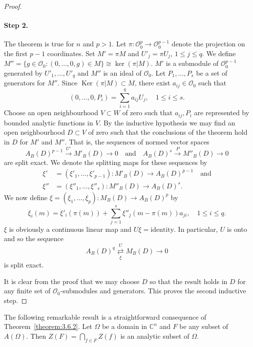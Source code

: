 \begin{proof}
\paragraph*{Step 2.} The theorem is true for $n$ and $p>1$. Let $\pi:\mathcal O_0^p\to\mathcal O_0^{p-1}$ denote the projection on the first $p-1$ coordinates. Set $M'=\pi M$ and $U'_j=\pi U_j$, $1\leq j\leq q$. We define $M''=\{g\in\mathcal O_0:(0,\ldots,0,g)\in M\}\cong\ker(\pi|M)$. $M'$ is a submodule of $\mathcal O_0^{p-1}$ generated by $U'_1,\ldots,U'_q$ and $M''$ is an ideal of $\mathcal O_0$. Let $P_1,\ldots,P_s$ be a set of generators for $M''$. Since $\operatorname{Ker}(\pi|M)\subset M$, there exist $a_{ij}\in\mathcal O_0$ such that
\[(0,\ldots,0,P_i)=\sum_{i=1}^q a_{ij}U_j,\quad1\leq i\leq s.\]
Choose an open neighbourhood $V\subset W$ of zero such that $a_{ij},P_i$ are represented by bounded analytic functions in $V$. By the inductive hypothesis we may find an open neighbourhood $D\subset V$ of zero such that the conclusions of the theorem hold in $D$ for $M'$ and $M''$. That is, the sequences of normed vector spaces
\[A_B(D)^{p-1}\xrightarrow{U'}M'_B(D)\to0\quad\text{and}\quad A_B(D)^s\xrightarrow{P}M''_B(D)\to0\]
are split exact. We denote the splitting maps for these sequences by
\begin{align*}
\xi'&=(\xi'_1,\ldots,\xi'_{p-1}):M'_B(D)\to A_B(D)^{p-1}\quad\text{and}\\
\xi''&=(\xi''_1,\ldots,\xi''_s):M''_B(D)\to A_B(D)^s.
\end{align*}
We now define $\xi=(\xi_1,\ldots,\xi_p):M_B(D)\to A_B(D)^p$ by
\[\xi_i(m)=\xi'_i(\pi(m))+\sum_{j=1}^s\xi''_j(m-\pi(m))a_{ji},\quad1\leq i\leq q.\]
$\xi$ is obviously a continuous linear map and $U\xi=\text{identity}$. In particular, $U$ is onto and so the sequence
\[A_B(D)^q\mathrel{\mathop{\rightleftarrows}\limits^{U}_{\xi}}M_B(D)\to0\]
is split exact.

It is clear from the proof that we may choose $D$ so that the result holds in $D$ for any finite set of $\mathcal O_0$-submodules and generators. This proves the second inductive step.
\end{proof}
The following remarkable result is a straightforward consequence of Theorem~\ref{theorem:3.6.2}.
 Let $\Omega$ be a domain in $\mathbb C^n$ and $F$ be any subset of $A(\Omega)$. Then $Z(F)=\bigcap_{f\in F}Z(f)$ is an analytic subset of $\Omega$.
